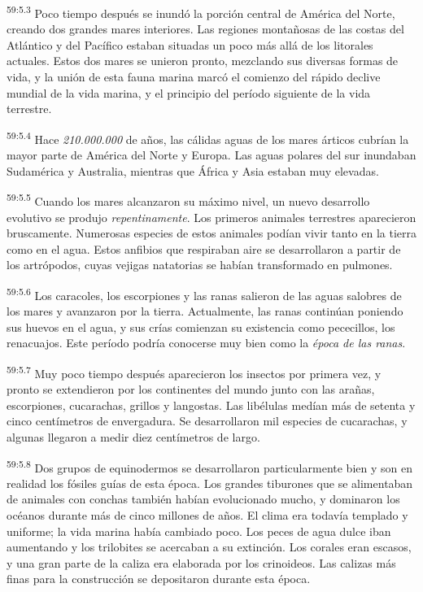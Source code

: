\par
\textsuperscript{59:5.3} Poco tiempo después se inundó la porción central de América del Norte, creando dos grandes mares interiores. Las regiones montañosas de las costas del Atlántico y del Pacífico estaban situadas un poco más allá de los litorales actuales. Estos dos mares se unieron pronto, mezclando sus diversas formas de vida, y la unión de esta fauna marina marcó el comienzo del rápido declive mundial de la vida marina, y el principio del período siguiente de la vida terrestre.

\par
\textsuperscript{59:5.4} Hace \textit{210.000.000} de años, las cálidas aguas de los mares árticos cubrían la mayor parte de América del Norte y Europa. Las aguas polares del sur inundaban Sudamérica y Australia, mientras que África y Asia estaban muy elevadas.

\par
\textsuperscript{59:5.5} Cuando los mares alcanzaron su máximo nivel, un nuevo desarrollo evolutivo se produjo \textit{repentinamente}. Los primeros animales terrestres aparecieron bruscamente. Numerosas especies de estos animales podían vivir tanto en la tierra como en el agua. Estos anfibios que respiraban aire se desarrollaron a partir de los artrópodos, cuyas vejigas natatorias se habían transformado en pulmones.

\par
\textsuperscript{59:5.6} Los caracoles, los escorpiones y las ranas salieron de las aguas salobres de los mares y avanzaron por la tierra. Actualmente, las ranas continúan poniendo sus huevos en el agua, y sus crías comienzan su existencia como pececillos, los renacuajos. Este período podría conocerse muy bien como la \textit{época de las ranas}.

\par
\textsuperscript{59:5.7} Muy poco tiempo después aparecieron los insectos por primera vez, y pronto se extendieron por los continentes del mundo junto con las arañas, escorpiones, cucarachas, grillos y langostas. Las libélulas medían más de setenta y cinco centímetros de envergadura. Se desarrollaron mil especies de cucarachas, y algunas llegaron a medir diez centímetros de largo.

\par
\textsuperscript{59:5.8} Dos grupos de equinodermos se desarrollaron particularmente bien y son en realidad los fósiles guías de esta época. Los grandes tiburones que se alimentaban de animales con conchas también habían evolucionado mucho, y dominaron los océanos durante más de cinco millones de años. El clima era todavía templado y uniforme; la vida marina había cambiado poco. Los peces de agua dulce iban aumentando y los trilobites se acercaban a su extinción. Los corales eran escasos, y una gran parte de la caliza era elaborada por los crinoideos. Las calizas más finas para la construcción se depositaron durante esta época.

